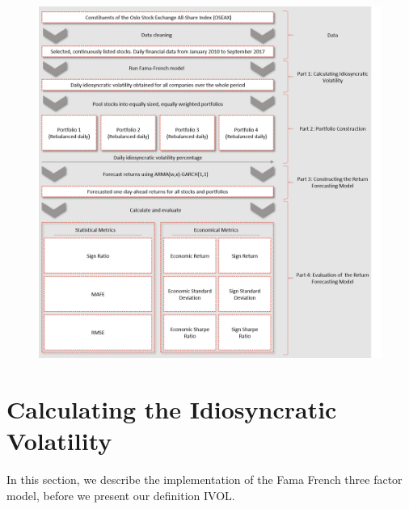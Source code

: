 \begin{figure}
    \centering
    \includegraphics[scale=0.5]{Pictures/FlowChart.png}
    \label{FlowChart}
\end{figure}

\newpage
\section{Calculating the Idiosyncratic Volatility}

In this section, we describe the implementation of the Fama French three factor model, before we present our definition IVOL.

